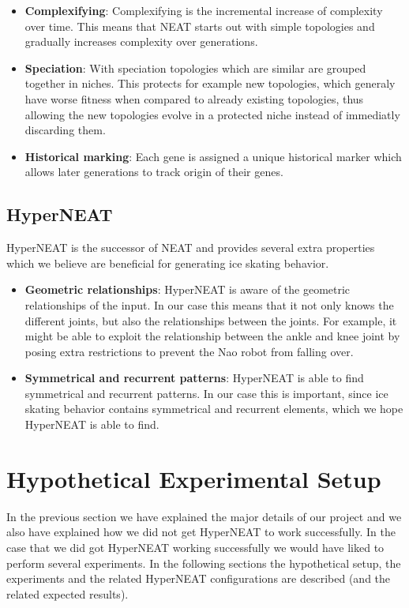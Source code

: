 \documentclass[a4paper,10pt]{article}
\begin{document}
\begin{itemize}
	\item \textbf{Complexifying}: Complexifying is the incremental increase of complexity over time. This means that NEAT starts out with simple topologies and gradually increases complexity over generations.
	\item \textbf{Speciation}: With speciation topologies which are similar are grouped together in niches. This protects for example new topologies, which generaly have worse fitness when compared to already existing topologies, thus allowing the new topologies evolve in a protected niche instead of immediatly discarding them.
	\item \textbf{Historical marking}: Each gene is assigned a unique historical marker which allows later generations to track origin of their genes.  
\end{itemize}

\subsection{HyperNEAT}
HyperNEAT is the successor of NEAT and provides several extra properties which we believe are beneficial for generating ice skating behavior.

\begin{itemize}
	\item \textbf{Geometric relationships}: HyperNEAT is aware of the geometric relationships of the input. In our case this means that it not only knows the different joints, but also the relationships between the joints. For example, it might be able to exploit the relationship between the ankle and knee joint by posing extra restrictions to prevent the Nao robot from falling over.
	\item \textbf{Symmetrical and recurrent patterns}: HyperNEAT is able to find symmetrical and recurrent patterns. In our case this is important, since ice skating behavior contains symmetrical and recurrent elements, which we hope HyperNEAT is able to find.
\end{itemize}


\section{Hypothetical Experimental Setup}
\label{sec:hypothetical-experimental-setup}
In the previous section we have explained the major details of our project and we also have explained how we did not get HyperNEAT to work successfully. In the case that we did got HyperNEAT working successfully we would have liked to perform several experiments. In the following sections the hypothetical setup, the experiments and the related HyperNEAT configurations are described (and the related expected results).
\end{document}
